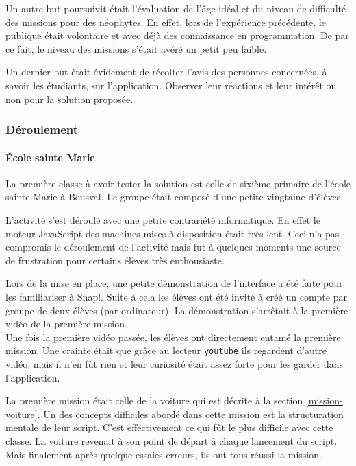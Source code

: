 Un autre but poursuivit était l'évaluation de l'âge idéal et du niveau de difficulté des missions pour des néophytes. En effet, lors de l'expérience précédente, le publique était volontaire et avec déjà des connaissance en programmation. De par ce fait, le niveau des missions s'était avéré un petit peu faible.

Un dernier but était évidement de récolter l'avis des personnes concernées, à savoir les étudiants, sur l'application. Observer leur réactions et leur intérêt ou non pour la solution proposée.

\subsubsection{Déroulement}
\paragraph{École sainte Marie} La première classe à avoir tester la solution est celle de sixième primaire de l'école sainte Marie à Bousval. Le groupe était composé d'une petite vingtaine d'élèves.

L'activité s'est déroulé avec une petite contrariété informatique. En effet le moteur JavaScript des machines mises à disposition était très lent. Ceci n'a pas compromis le déroulement de l'activité mais fut à quelques moments une source de frustration pour certains élèves très enthousiaste.

Lors de la mise en place, une petite démonstration de l'interface a été faite pour les familiariser à Snap!. Suite à cela les élèves ont été invité à créé un compte par groupe de deux élèves (par ordinateur). La démonstration s'arrêtait à la première vidéo de la première mission.\\

Une fois la première vidéo passée, les élèves ont directement entamé la première mission. Une crainte était que grâce au lecteur \texttt{youtube} ils regardent d'autre vidéo, mais il n'en fût rien et leur curiosité était assez forte pour les garder dans l'application.

La première mission était celle de la voiture qui est décrite à la section \ref{mission-voiture}. Un des concepts difficiles abordé dans cette mission est la structuration mentale de leur script. C'est effectivement ce qui fût le plus difficile avec cette classe. La voiture revenait à son point de départ à chaque lancement du script. Mais finalement après quelque essaies-erreurs, ils ont tous réussi la mission.\\

